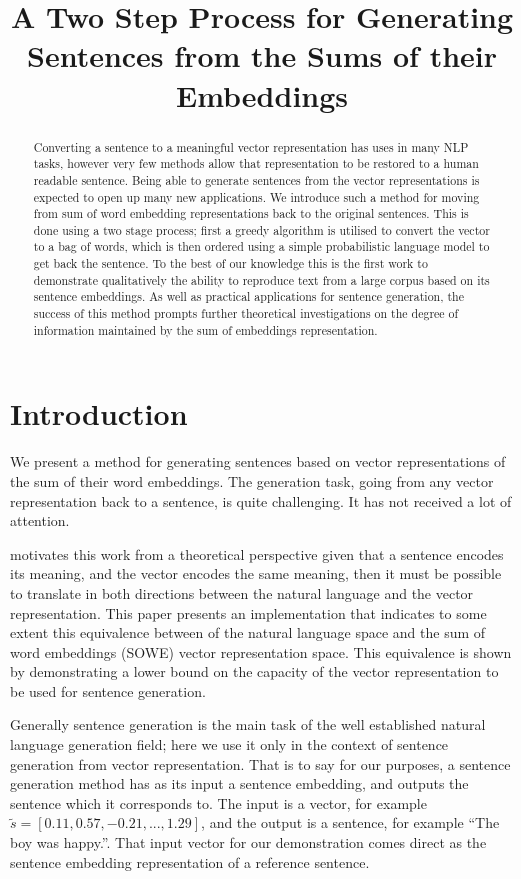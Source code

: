 \documentclass[11pt]{article}
\title{A Two Step Process for Generating Sentences from the Sums of their Embeddings}
\author{}
\theoremstyle{plain}
\theoremstyle{definition}
\newcommand{\textcite}{\protect\newcite}
\begin{document}
\maketitle

\begin{abstract}

	
Converting a sentence to a meaningful vector representation has uses in many NLP tasks, however very few methods allow that representation to be restored to a human readable sentence. Being able to generate sentences from the vector representations is expected to open up many new applications. We introduce such a method for moving from sum of word embedding representations back to the original sentences. This is done using a two stage process; first a greedy algorithm is utilised to convert the vector to a bag of words, which is then ordered using a simple probabilistic language model to get back the sentence. To the best of our knowledge this is the first work to demonstrate qualitatively the ability to reproduce text from a large corpus based on its sentence embeddings. 
As well as practical applications for sentence generation, the success of this method prompts further theoretical investigations on the degree of information maintained by the sum of embeddings representation.
\end{abstract}

\section{Introduction} \label{intro}
We present a method for generating sentences based on vector representations of the sum of their word embeddings. The generation task, going from any vector representation back to a sentence, is quite challenging. It has not received a lot of attention.

\textcite{Dinu2014CompositionalGeneration} motivates this work from a theoretical perspective given that a sentence encodes its meaning, and the vector encodes the same meaning, then it must be possible to translate in both directions between the natural language and the vector representation. This paper presents an implementation that indicates to some extent this equivalence between of the natural language space and the sum of word embeddings (SOWE) vector representation space. This equivalence is shown by demonstrating a lower bound on the capacity of the vector representation to be used for sentence generation. 

Generally sentence generation is the main task of the well established natural language generation field; here we use it only in the context of sentence generation from vector representation. That is to say for our purposes, a sentence generation method has as its input a sentence embedding, and outputs the sentence which it corresponds to. The input is a vector, for example $\tilde{s}=[0.11, 0.57,-0.21,...,1.29]$, and the output is a sentence, for example ``The boy was happy.''. That input vector for our demonstration comes direct as the sentence embedding representation of a reference sentence. 
\end{document}
